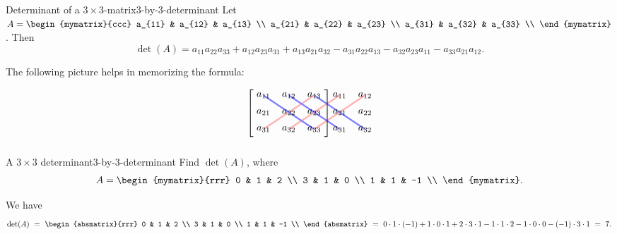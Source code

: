\begin{definition}{Determinant of a $3\times 3$-matrix}{3-by-3-determinant}
  Let $A=\begin{mymatrix}{ccc}
    a_{11} & a_{12} & a_{13} \\
    a_{21} & a_{22} & a_{23} \\
    a_{31} & a_{32} & a_{33} \\
  \end{mymatrix}$. Then
  \begin{equation*}
    \det(A)
    = a_{11}a_{22}a_{33}
    + a_{12}a_{23}a_{31}
    + a_{13}a_{21}a_{32}
    - a_{31}a_{22}a_{13}
    - a_{32}a_{23}a_{11}
    - a_{33}a_{21}a_{12}.
  \end{equation*}
\end{definition}

The following picture helps in memorizing the formula:
\begin{equation*}
  \begin{tikzpicture}[yscale=0.6,xscale=0.9]
    \draw[ultra thick,red!30] (1,-3) -- (3,-1);
    \draw[ultra thick,red!30] (2,-3) -- (4,-1);
    \draw[ultra thick,red!30] (3,-3) -- (5,-1);
    \draw[ultra thick,blue!50] (1,-1) -- (3,-3);
    \draw[ultra thick,blue!50] (2,-1) -- (4,-3);
    \draw[ultra thick,blue!50] (3,-1) -- (5,-3);
    \foreach\i in {1,2,3} {
      \foreach\j in {1,2,3} {
        \path (\j,-\i) node {$a_{\i\j}$};
      }
    }
    \foreach\i in {1,2,3} {
      \foreach\j in {1,2} {
        \path (\j,-\i) + (3,0) node {$a_{\i\j}$};
      }
    }
    \draw(0.5,-2) node {$\left[\rule{0mm}{1.0cm}\right.$};
    \draw(3.5,-2) node {$\left.\rule{0mm}{1.0cm}\right]$};
  \end{tikzpicture}
\end{equation*}

\begin{example}{A $3\times 3$ determinant}{3-by-3-determinant}
  Find $\det(A)$, where
  \begin{equation*}
    A = \begin{mymatrix}{rrr}
      0 & 1 & 2 \\
      3 & 1 & 0 \\
      1 & 1 & -1 \\
    \end{mymatrix}.
  \end{equation*}
\end{example}

\begin{solution}
  We have
  \begin{equation*}
    \det(A) ~=~
    \begin{absmatrix}{rrr}
      0 & 1 & 2 \\
      3 & 1 & 0 \\
      1 & 1 & -1 \\
    \end{absmatrix}
    ~=~
    0\cdot 1\cdot (-1)
    + 1\cdot 0 \cdot 1
    + 2 \cdot 3 \cdot 1
    - 1\cdot 1\cdot 2
    - 1\cdot 0\cdot 0
    - (-1)\cdot 3\cdot 1
    ~=~ 7.
  \end{equation*}
\end{solution}
